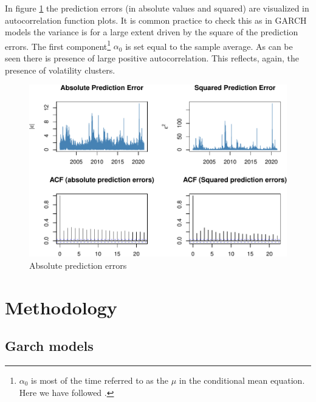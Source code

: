 \documentclass[a4paper, nobind]{templates/ociamthesis}
\begin{document}
\noindent In figure \ref{fig:acfplots} the prediction errors (in absolute values and squared) are visualized in autocorrelation function plots. It is common practice to check this as in GARCH models the variance is for a large extent driven by the square of the prediction errors. The first component\footnote{\(\alpha_0\) is most of the time referred to as the \(\mu\) in the conditional mean equation. Here we have followed \textcite{bali2008}.} \(\alpha_0\) is set equal to the sample average. As can be seen there is presence of large positive autocorrelation. This reflects, again, the presence of volatility clusters.~\\

\begin{figure}[!ht]

{\centering \includegraphics[width=1\linewidth]{_main_files/figure-latex/acfplots-1} 

}

\caption{Absolute prediction errors}\label{fig:acfplots}
\end{figure}

\clearpage

\hypertarget{methodology}{%
\section{Methodology}\label{methodology}}

\hypertarget{garch-method}{%
\subsection{Garch models}\label{garch-method}}
\end{document}
